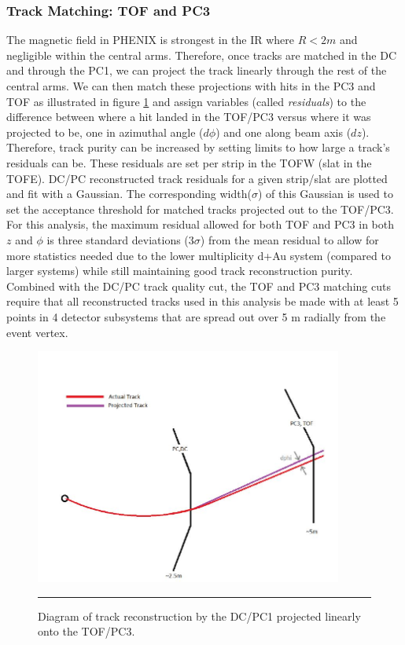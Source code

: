 \subsubsection{Track Matching: TOF and PC3}
The magnetic field in PHENIX is strongest in the IR where $R<2 m$ and negligible within the central arms\citep{rolnickthesis}. Therefore, once tracks are matched in the DC and through the PC1, we can project the track linearly through the rest of the central arms. We can then match these projections with hits in the PC3 and TOF as illustrated in figure \ref{fig:pc3tofmatching} and assign variables (called \textit{residuals}) to the difference between where a hit landed in the TOF/PC3 versus where it was projected to be, one in azimuthal angle ($d\phi$) and one along beam axis ($dz$). Therefore, track purity can be increased by setting limits to how large a track's residuals can be. These residuals are set per strip in the TOFW (slat in the TOFE). DC/PC reconstructed track residuals for a given strip/slat are plotted and fit with a Gaussian. The corresponding width($\sigma$) of this Gaussian is used to set the acceptance threshold for matched tracks projected out to the TOF/PC3. For this analysis, the maximum residual allowed for both TOF and PC3 in both $z$ and $\phi$ is three standard deviations ($3\sigma$) from the mean residual to allow for more statistics needed due to the lower multiplicity d+Au system (compared to larger systems) while still maintaining good track reconstruction purity. Combined with the DC/PC track quality cut, the TOF and PC3 matching cuts require that all reconstructed tracks used in this analysis be made with at least 5 points in 4 detector subsystems that are spread out over 5 m radially from the event vertex.
\begin{figure}[htbp!]
  \centering
    \includegraphics[width=0.9\textwidth]{Figures/pc3tofmatching.JPG}
    \rule{35em}{0.5pt}
  \caption[Diagram of track reconstruction by the DC/PC1 projected linearly onto the TOF/PC3]{Diagram of track reconstruction by the DC/PC1 projected linearly onto the TOF/PC3. \citep{schaeferthesis}}
  \label{fig:pc3tofmatching}
\end{figure}

